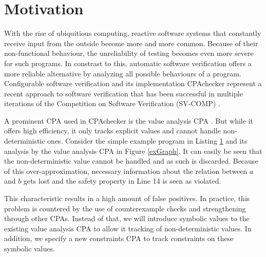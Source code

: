\section{Motivation}
With the rise of ubiquitious computing, reactive software systems that constantly receive input from the outside become more and more common.
Because of their non\--func\-tio\-nal behaviour, the unreliability of testing becomes even more severe for such programs.
In constrast to this, automatic software verification offers a more reliable alternative by analyzing all possible behaviours of a program.
Configurable software verification\cite{Beyer2007} and its implementation CPAchecker\cite{Beyer2011} represent a recent approach to software verification that has been successful in
multiple iterations of the Competition on Software Verification (SV-COMP) \cite{SV-COMP2013} \cite{SV-COMP2014} \cite{SV-COMP2015}.

A prominent CPA used in CPAchecker is the value analysis CPA \cite{Beyer2013}.
But while it offers high efficiency, it only tracks explicit values and cannot handle non-deterministic ones.
Consider the simple example program in Listing \ref{exProg} and its analysis by the value analysis CPA in Figure \ref{exGraph}.
It can easily be seen that the non-deterministic value cannot be handled and as such is discarded.
Because of this over-approximation, necessary information about the relation between $a$ and $b$ gets lost and the safety property in Line 14 is seen as violated.

\begin{figure}[h]
\label{exProg}
\lstset{numbers=left}

\end{figure}

This characteristic results in a high amount of false positives.
In practice, this problem is countered by the use of counterexample checks and strengthening through other CPAs.
Instead of that, we will introduce symbolic values to the existing value analysis CPA to allow it tracking of non-deterministic values.
In addition, we specify a new constraints CPA to track constraints on these symbolic values.

